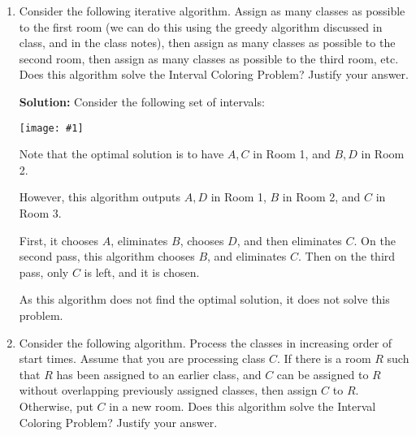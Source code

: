\documentclass{article}
\providecommand{\soln}{\textbf{Solution: }}
\providecommand{\image}[1]{
    \begin{center}
        \texttt{[image: \#1]}
    \end{center}
}
\begin{document}
    \begin{enumerate}[label=\Alph*.]
        \item Consider the following iterative algorithm. Assign as many classes as possible to the first room (we can do this using the greedy algorithm discussed in class, and in the class notes), then assign as many classes as possible to the second room, then assign as many classes as possible to the third room, etc. Does this algorithm solve the Interval Coloring Problem? Justify your answer.
        
        \soln Consider the following set of intervals:
        
        \image{p2a_counterexample}
        
        Note that the optimal solution is to have $A,C$ in Room 1, and $B, D$ in Room 2.
        
        However, this algorithm outputs $A, D$ in Room 1, $B$ in Room 2, and $C$ in Room 3.
        
        First, it chooses $A$, eliminates $B$, chooses $D$, and then eliminates $C$. On the second pass, this algorithm chooses $B$, and eliminates $C$.
        Then on the third pass, only $C$ is left, and it is chosen.
        
        As this algorithm does not find the optimal solution, it does not solve this problem.
        
        \item Consider the following algorithm. Process the classes in increasing order of start times. Assume that you are processing class $C$. If there is a room $R$ such that $R$ has been assigned to an earlier class, and $C$ can be assigned to $R$ without overlapping previously assigned classes, then assign $C$ to $R$. Otherwise, put $C$ in a new room. Does this algorithm solve the Interval Coloring Problem?
        Justify your answer.
    \end{enumerate}
    
\end{document}
